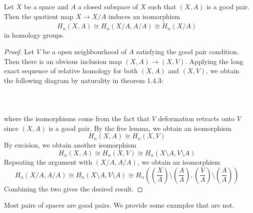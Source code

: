 \documentclass[a4paper]{article}
\begin{document}
\begin{prp}{}{} Let $X$ be a space and $A$ a closed subspace of $X$ such that $(X,A)$ is a good pair. Then the quotient map $X\to X/A$ induces an isomorphism $$H_n(X,A)\cong H_n(X/A,A/A)\cong\widetilde{H}_n(X/A)$$ in homology groups. \tcbline
\begin{proof}
Let $V$ be a open neighbourhood of $A$ satisfying the good pair condition. Then there is an obvious inclusion map $(X,A)\to(X,V)$. Applying the long exact sequence of relative homology for both $(X,A)$ and $(X,V)$, we obtain the following diagram by naturality in theorem 1.4.3: \\~\\
\\~\\
where the isomorphisms come from the fact that $V$ deformation retracts onto $V$ since $(X,A)$ is a good pair. By the five lemma, we obtain an isomorphism $$H_n(X,A)\cong H_n(X,V)$$ By excision, we obtain another isomorphism $$H_n(X,A)\cong H_n(X,V)\cong H_n(X\setminus A,V\setminus A)$$ Repeating the argument with $(X/A,A/A)$, we obtain an isomorphism $$H_n(X/A,A/A)\cong H_n(X\setminus A,V\setminus A)\cong H_n\left(\left(\frac{X}{A}\right)\setminus\left(\frac{A}{A}\right),\left(\frac{V}{A}\right)\setminus\left(\frac{A}{A}\right)\right)$$ Combining the two gives the desired result. 
\end{proof}
\end{prp}

Most pairs of spaces are good pairs. We provide some examples that are not. \\~\\
\end{document}

